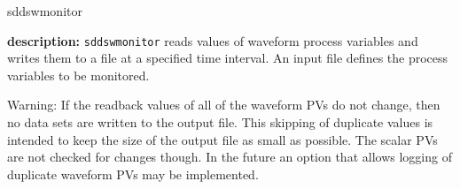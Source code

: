%
%
\begin{sddsprog}{sddswmonitor}
\item {\bf description:}
%
%
\verb+sddswmonitor+ reads values of waveform process variables 
and writes them to a file at a specified time interval.
An input file defines the process variables to be monitored.

Warning: If the readback values of all of the waveform PVs do not
change, then no data sets are written to the output file. This
skipping of duplicate values is intended to keep the size of the
output file as small as possible.  The scalar PVs are not checked for
changes though. In the future an option that allows logging of duplicate
waveform PVs may be implemented.


\end{sddsprog}

